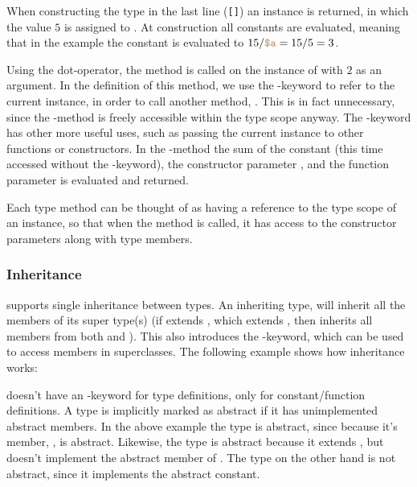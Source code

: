 When constructing the type in the last line (\texttt{[]})
an instance is returned, in which the value $5$ is assigned to .
At construction all constants are evaluated, meaning that in the example
the constant  is evaluated to $15 / \variable{a} = 15 / 5 = 3$.

Using the dot-operator, the method  is called on the instance of
 with $2$ as an argument. In the definition of this method, we use the
-keyword to refer to the current instance, in order to call another
method, . This is in fact unnecessary, since the
-method is freely accessible within the type scope anyway. The
-keyword has other more useful uses, such as passing the current
instance to other functions or constructors. In the -method
the sum of the constant  (this time accessed without the
-keyword), the constructor parameter , and the function
parameter  is evaluated and returned.

Each type method can be thought of as having a reference to the type scope of an
instance, so that when the method is called, it has access to the constructor 
parameters along with type members.

\subsubsection{Inheritance}

\productname{} supports single inheritance between types. An inheriting type, will
inherit all the members of its super type(s) (if  extends , which
extends , then  inherits all members from both  and ).
This also introduces the -keyword, which can be used to access members
in superclasses. The following example shows how inheritance works:


\productname{} doesn't have an -keyword for type definitions, only
for constant/function definitions. A type is implicitly marked as abstract if it has
unimplemented abstract members. In the above example the type  is abstract,
since because it's member, , is abstract. Likewise, the type
 is abstract because it extends , but doesn't implement the abstract
member of . The type  on the other hand is not abstract, since it
implements the abstract constant.

